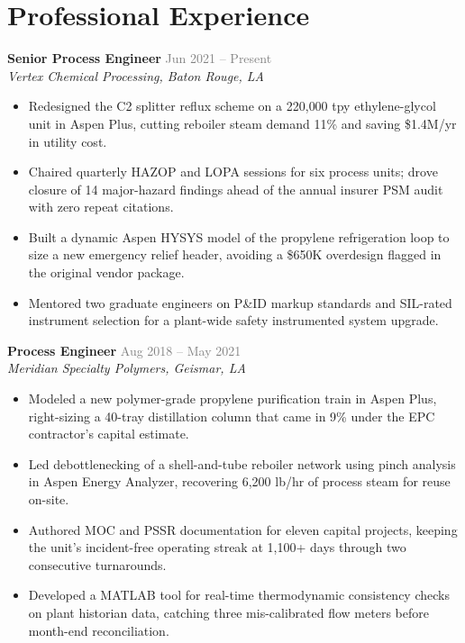 \documentclass[10.5pt,letterpaper]{article}
\newcommand{\role}[3]{%
  \textbf{\color{primary}#1} \hfill \textcolor{graytext}{\small #2}\\
  \textit{\color{accent}\small #3}\par\vspace{2pt}
}
\begin{document}
\section*{\textcolor{primary}{Professional Experience}}
\vspace{-11pt}
{\color{rulegray}\titlerule[0.9pt]}
\vspace{4pt}

\role{Senior Process Engineer}{Jun 2021 -- Present}{Vertex Chemical Processing, Baton Rouge, LA}
\begin{itemize}
  \item Redesigned the C2 splitter reflux scheme on a 220{,}000 tpy ethylene-glycol unit in Aspen
  Plus, cutting reboiler steam demand 11\% and saving \$1.4M/yr in utility cost.
  \item Chaired quarterly HAZOP and LOPA sessions for six process units; drove closure of 14
  major-hazard findings ahead of the annual insurer PSM audit with zero repeat citations.
  \item Built a dynamic Aspen HYSYS model of the propylene refrigeration loop to size a new
  emergency relief header, avoiding a \$650K overdesign flagged in the original vendor package.
  \item Mentored two graduate engineers on P\&ID markup standards and SIL-rated instrument
  selection for a plant-wide safety instrumented system upgrade.
\end{itemize}

\role{Process Engineer}{Aug 2018 -- May 2021}{Meridian Specialty Polymers, Geismar, LA}
\begin{itemize}
  \item Modeled a new polymer-grade propylene purification train in Aspen Plus, right-sizing
  a 40-tray distillation column that came in 9\% under the EPC contractor's capital estimate.
  \item Led debottlenecking of a shell-and-tube reboiler network using pinch analysis in Aspen
  Energy Analyzer, recovering 6{,}200 lb/hr of process steam for reuse on-site.
  \item Authored MOC and PSSR documentation for eleven capital projects, keeping the unit's
  incident-free operating streak at 1{,}100+ days through two consecutive turnarounds.
  \item Developed a MATLAB tool for real-time thermodynamic consistency checks on plant
  historian data, catching three mis-calibrated flow meters before month-end reconciliation.
\end{itemize}
\end{document}
